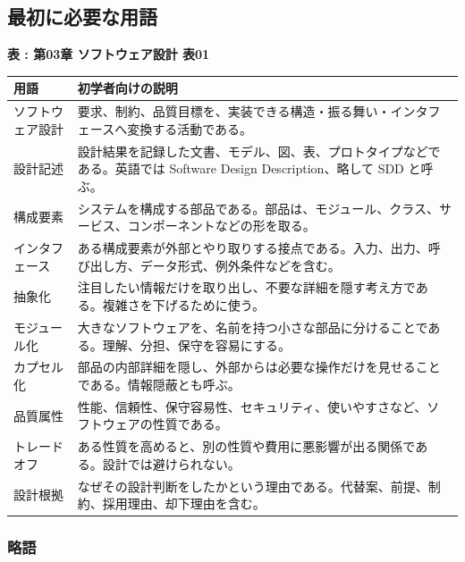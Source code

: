 \subsection*{最初に必要な用語}

\par\smallskip\noindent{}\label{tab:ch03-01}\textbf{表 \thetable: 第03章 ソフトウェア設計 表01}\par\smallskip
\begin{tabularx}{\linewidth}{L{34mm}Y}
\toprule
\textbf{用語} & \textbf{初学者向けの説明} \\
\midrule
ソフトウェア設計 & 要求、制約、品質目標を、実装できる構造・振る舞い・インタフェースへ変換する活動である。 \\
設計記述 & 設計結果を記録した文書、モデル、図、表、プロトタイプなどである。英語では Software Design Description、略して SDD と呼ぶ。 \\
構成要素 & システムを構成する部品である。部品は、モジュール、クラス、サービス、コンポーネントなどの形を取る。 \\
インタフェース & ある構成要素が外部とやり取りする接点である。入力、出力、呼び出し方、データ形式、例外条件などを含む。 \\
抽象化 & 注目したい情報だけを取り出し、不要な詳細を隠す考え方である。複雑さを下げるために使う。 \\
モジュール化 & 大きなソフトウェアを、名前を持つ小さな部品に分けることである。理解、分担、保守を容易にする。 \\
カプセル化 & 部品の内部詳細を隠し、外部からは必要な操作だけを見せることである。情報隠蔽とも呼ぶ。 \\
品質属性 & 性能、信頼性、保守容易性、セキュリティ、使いやすさなど、ソフトウェアの性質である。 \\
トレードオフ & ある性質を高めると、別の性質や費用に悪影響が出る関係である。設計では避けられない。 \\
設計根拠 & なぜその設計判断をしたかという理由である。代替案、前提、制約、採用理由、却下理由を含む。 \\
\bottomrule
\end{tabularx}

\subsubsection*{略語}

